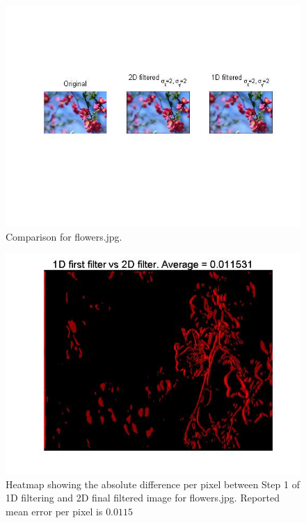 \documentclass[11pt]{article}
\begin{document}
\begin{figure}[H]
	\centering
	\includegraphics[width=.9\textwidth]{imgs/flowers_conv.jpg}
	\caption{Comparison for flowers.jpg.}
	\label{fig:flowers}
\end{figure}

\begin{figure}[H]
	\centering
	\includegraphics[width=.9\textwidth]{imgs/flowers_col_heatmap.jpg}
	\caption{Heatmap showing the absolute difference per pixel between Step 1 of 1D filtering and 2D final filtered image for flowers.jpg. Reported mean error per pixel is $0.0115$}
	\label{fig:flowers_col_heatmap}
\end{figure}
\end{document}
